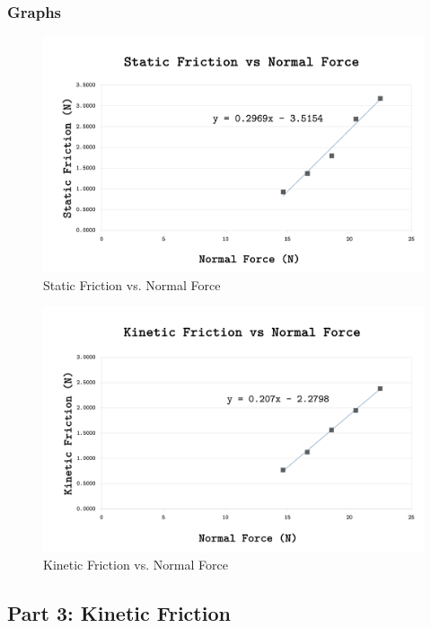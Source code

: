 \subsubsection{Graphs}
\begin{figure}[H]
	\begin{center}
		\captionsetup{font=large}
		\caption{Static Friction vs. Normal Force}\label{fig:SFvNF}
		\includegraphics[width=0.90\columnwidth]{images/GraphSFvNF}
	\end{center}
\end{figure}


\begin{figure}[H]
	\begin{center}
		\captionsetup{font=large}
		\caption{Kinetic Friction vs. Normal Force}\label{fig:KFvNF}
		\includegraphics[width=0.90\columnwidth]{images/GraphKFvNF}
	\end{center}
\end{figure}


\subsection{Part 3: Kinetic Friction}


